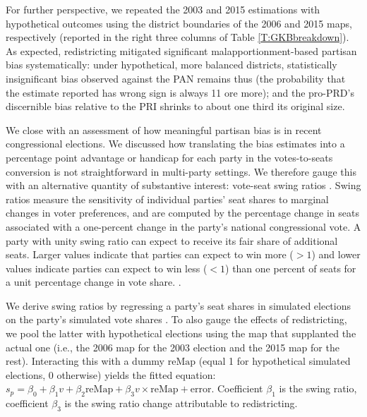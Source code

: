 \documentclass[letter,12pt]{article}
\begin{document}
{For further perspective, we repeated the 2003 and 2015 estimations with hypothetical outcomes using the district boundaries of the 2006 and 2015 maps, respectively (reported in the right three columns of Table \ref{T:GKBbreakdown}). As expected, redistricting mitigated significant malapportionment-based partisan bias systematically: under hypothetical, more balanced districts, statistically insignificant bias observed against the PAN remains thus (the probability that the estimate reported has wrong sign is always 11 ore more); and the pro-PRD's discernible bias relative to the PRI shrinks to about one third its original size.  


We close with an assessment of how meaningful partisan bias is in recent congressional elections. We discussed how translating the bias estimates into a percentage point advantage or handicap for each party in the votes-to-seats conversion is not straightforward in multi-party settings. We therefore gauge this with an alternative quantity of substantive interest: vote-seat swing ratios \citep{tufte1973seatsVotes,niemi.fett1986swing}. Swing ratios measure the sensitivity of individual parties' seat shares to marginal changes in voter preferences, and are computed by the percentage change in seats associated with a one-percent change in the party's national congressional vote. A party with unity swing ratio can expect to receive its fair share of additional seats. Larger values indicate that parties can expect to win more ($>1$) and lower values indicate parties can expect to win less ($<1$) than one percent of seats for a unit percentage change in vote share. \citep[We rule out negative swing ratios corresponding to a party losing seats as it wins votes; for violations of the monotonicity principle of representation, see][]{balinskiYoung2001FairRep}. 

We derive swing ratios by regressing a party's seat shares in simulated elections on the party's simulated vote shares \citep{linzerSeatVoteElasticity2012}. To also gauge the effects of redistricting, we pool the latter with hypothetical elections using the map that supplanted the actual one (i.e., the 2006 map for the 2003 election and the 2015 map for the rest). Interacting this with a dummy $\text{reMap}$ (equal 1 for hypothetical simulated elections, 0 otherwise) yields the fitted equation: $s_p = \beta_0 + \beta_1 v + \beta_2 \text{reMap} + \beta_3 v \times \text{reMap} + \text{error}$. Coefficient $\beta_1$ is the swing ratio, coefficient $\beta_3$ is the swing ratio change attributable to redistricting. 

}
\end{document}
